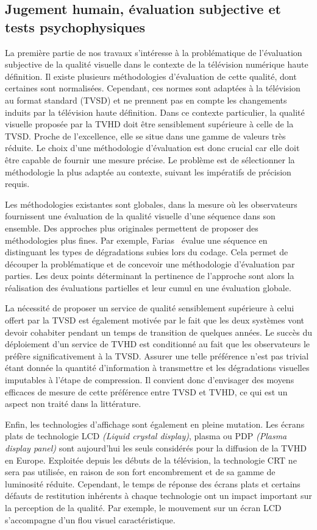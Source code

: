 \subsection*{Jugement humain, évaluation subjective et tests psychophysiques}
La première partie de nos travaux s'intéresse à la problématique de l'évaluation subjective de la qualité visuelle dans le contexte de la télévision numérique haute définition. Il existe plusieurs méthodologies d'évaluation de cette qualité, dont certaines sont normalisées. Cependant, ces normes sont adaptées à la télévision au format standard (TVSD) et ne prennent pas en compte les changements induits par la télévision haute définition. Dans ce contexte particulier, la qualité visuelle proposée par la TVHD doit être sensiblement supérieure à celle de la TVSD. Proche de l'excellence, elle se situe dans une gamme de valeurs très réduite. Le choix d'une méthodologie d'évaluation est donc crucial car elle doit être capable de fournir une mesure précise. Le problème est de sélectionner la méthodologie la plus adaptée au contexte, suivant les impératifs de précision requis.

Les méthodologies existantes sont globales, dans la mesure où les observateurs fournissent une évaluation de la qualité visuelle d'une séquence dans son ensemble. Des approches plus originales permettent de proposer des méthodologies plus fines. Par exemple, Farias~\cite{farias-phd} évalue une séquence en distinguant les types de dégradations subies lors du codage. Cela permet de découper la problématique et de concevoir une méthodologie d'évaluation par parties. Les deux points déterminant la pertinence de l'approche sont alors la réalisation des évaluations partielles et leur cumul en une évaluation globale.

\bigskip

La nécessité de proposer un service de qualité sensiblement supérieure à celui offert par la TVSD est également motivée par le fait que les deux systèmes vont devoir cohabiter pendant un temps de transition de quelques années. Le succès du déploiement d'un service de TVHD est conditionné au fait que les observateurs le préfère significativement à la TVSD. Assurer une telle préférence n'est pas trivial étant donnée la quantité d'information à transmettre et les dégradations visuelles imputables à l'étape de compression. Il convient donc d'envisager des moyens efficaces de mesure de cette préférence entre TVSD et TVHD, ce qui est un aspect non traité dans la littérature.

Enfin, les technologies d'affichage sont également en pleine mutation. Les écrans plats de technologie LCD \emph{(Liquid crystal display)}, plasma ou PDP \emph{(Plasma display panel)} sont aujourd'hui les seuls considérés pour la diffusion de la TVHD en Europe. Exploitée depuis les débuts de la télévision, la technologie CRT ne sera pas utilisée, en raison de son fort encombrement et de sa gamme de luminosité réduite. Cependant, le temps de réponse des écrans plats et certains défauts de restitution inhérents à chaque technologie ont un impact important sur la perception de la qualité. Par exemple, le mouvement sur un écran LCD s'accompagne d'un flou visuel caractéristique.

